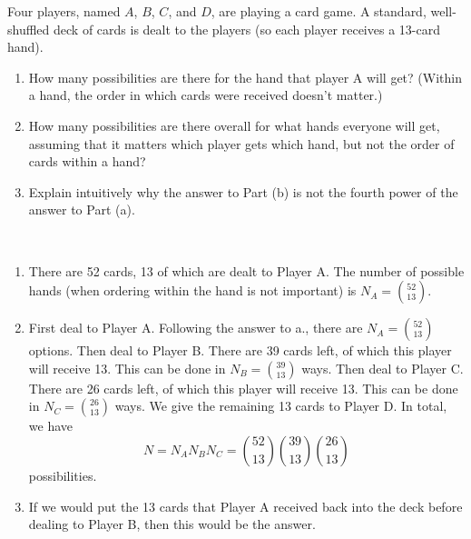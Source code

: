 
\setcounter{theorem}{8}

\begin{exercise}[BH.12]
	Four players, named $A$, $B$, $C$, and $D$, are playing a card game. A standard, well-shuffled deck of cards is dealt to the players (so each player receives a 13-card hand).
	\begin{enumerate}
		\item How many possibilities are there for the hand that player A will get? (Within a hand, the order in which cards were received doesn’t matter.)
		\item How many possibilities are there overall for what hands everyone will get, assuming that it matters which player gets which hand, but not the order of cards within a hand?
		\item Explain intuitively why the answer to Part (b) is not the fourth power of the answer to Part (a).
	\end{enumerate}
\begin{solution}~
	\begin{enumerate}
		\item There are 52 cards, 13 of which are dealt to Player A. The number of possible hands (when ordering within the hand is not important) is $N_{A}={52 \choose 13}$.
	 	\item First deal to Player A. Following the answer to a., there are $N_{A}={52 \choose 13}$ options. Then deal to Player B. There are 39 cards left, of which this player will receive 13. This can be done in $N_{B} ={39 \choose 13}$ ways. Then deal to Player C. There are 26 cards left, of which this player will receive 13. This can be done in $N_{C}={26\choose 13}$ ways. We give the remaining 13 cards to Player D. In total, we have $$N = N_{A}N_{B}N_{C} = {52 \choose 13}{39 \choose 13}{26 \choose 13}$$ possibilities.
	 	\item If we would put the 13 cards that Player A received back into the deck before dealing to Player B, then this would be the answer.
	\end{enumerate}
\end{solution}
\end{exercise}



